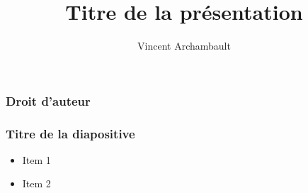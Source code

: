 \documentclass[aspectratio=169]{beamer}
\title{Titre de la présentation}
\author{Vincent Archambault}
\date{}
\begin{document}
\maketitle

\begin{frame}
    \frametitle{Droit d'auteur}
    {\doclicenseThis}
\end{frame}

\begin{frame}
    \frametitle{Titre de la diapositive}
    \begin{itemize}
    \item Item 1
    \item Item 2
    \end{itemize}
\end{frame}
\end{document}
